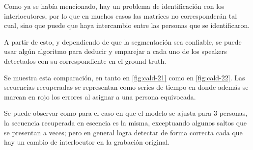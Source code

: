 Como ya se había mencionado, hay un problema de identificación con los interlocutores, por lo que en muchos casos las matrices no corresponderán tal cual, sino que puede que haya intercambio entre las personas que se identificaron.

A partir de esto, y dependiendo de que la segmentación sea confiable, se puede usar algún algoritmo para deducir y emparejar a cada uno de los speakers detectados con su correspondiente en el ground truth.

Se muestra esta comparación, en tanto en \autoref{fig:cald-21} como en \autoref{fig:cald-22}. Las secuencias recuperadas se representan como series de tiempo en donde además se marcan en rojo los errores al asignar a una persona equivocada.

Se puede observar como para el caso en que el modelo se ajusta para 3 personas, la secuencia recuperada en escencia es la misma, exceptuando algunos saltos que se presentan a veces; pero en general logra detectar de forma correcta cada que hay un cambio de interlocutor en la grabación original.

